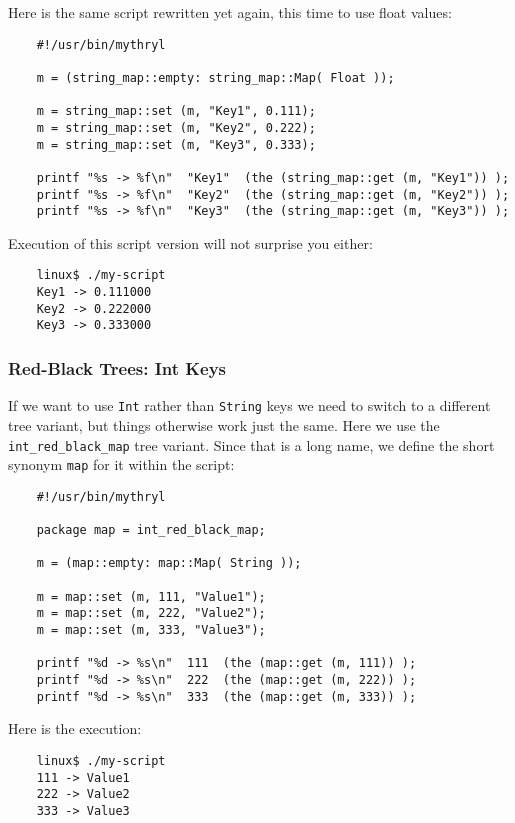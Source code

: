 Here is the same script rewritten yet again, this time to use float values:

\begin{verbatim}
    #!/usr/bin/mythryl

    m = (string_map::empty: string_map::Map( Float ));

    m = string_map::set (m, "Key1", 0.111);
    m = string_map::set (m, "Key2", 0.222);
    m = string_map::set (m, "Key3", 0.333);

    printf "%s -> %f\n"  "Key1"  (the (string_map::get (m, "Key1")) );
    printf "%s -> %f\n"  "Key2"  (the (string_map::get (m, "Key2")) );
    printf "%s -> %f\n"  "Key3"  (the (string_map::get (m, "Key3")) );
\end{verbatim}

Execution of this script version will not surprise you either:

\begin{verbatim}
    linux$ ./my-script
    Key1 -> 0.111000
    Key2 -> 0.222000
    Key3 -> 0.333000
\end{verbatim}

\cutend*

\subsubsection{Red-Black Trees: Int Keys}

If we want to use {\tt Int} rather than {\tt String} keys we need to 
switch to a different tree variant, but things otherwise work just 
the same.  Here we use the {\tt int\_red\_black\_map} tree variant. 
Since that is a long name, we define the short synonym {\tt map} 
for it within the script:

\begin{verbatim}
    #!/usr/bin/mythryl

    package map = int_red_black_map;

    m = (map::empty: map::Map( String ));

    m = map::set (m, 111, "Value1");
    m = map::set (m, 222, "Value2");
    m = map::set (m, 333, "Value3");

    printf "%d -> %s\n"  111  (the (map::get (m, 111)) );
    printf "%d -> %s\n"  222  (the (map::get (m, 222)) );
    printf "%d -> %s\n"  333  (the (map::get (m, 333)) );
\end{verbatim}

Here is the execution:

\begin{verbatim}
    linux$ ./my-script
    111 -> Value1
    222 -> Value2
    333 -> Value3
\end{verbatim}


